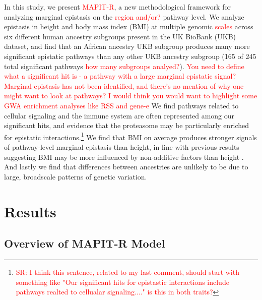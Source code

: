 \documentclass[12pt,a4paper]{article}
\newcommand{\red}[1]{\textcolor{red}{#1}}
\begin{document}
In this study, we present \red{MAPIT-R}, a new methodological framework for analyzing marginal epistasis on the \red{region and/or?} pathway level. We analyze epistasis in height and body mass index (BMI) at multiple genomic \red{scales} across six different human ancestry subgroups present in the UK BioBank (UKB) \citep{Sudlow2015} dataset, and find that an African ancestry UKB subgroup produces many more significant epistatic pathways than any other UKB ancestry subgroup (165 of 245 total significant pathways \red{how many subgroups analyed?}). \red{You need to define what a significant hit is - a pathway with a large marginal epistatic signal? Marginal epistasis has not been identified, and there's no mention of why one might want to look at pathways? I would think you would want to highlight some GWA enrichment analyses like RSS and gene-e} We find pathways related to cellular signaling and the immune system are often represented among our significant hits, and evidence that the proteasome may be particularly enriched for epistatic interactions.\footnote{\red{SR: I think this sentence, related to my last comment, should start with something like "Our significant hits for epistastic interactions include pathways realted to cellualar signaling...." is this in both traits?}} We find that BMI on average produces stronger signals of pathway-level marginal epistasis than height, in line with previous results suggesting BMI may be more influenced by non-additive factors than height \citep{Elks2012,Visscher2012}. And lastly we find that differences between ancestries are unlikely to be due to large, broadscale patterns of genetic variation.  








\section{Results}\label{InterPath-Results}

\subsection{Overview of MAPIT-R Model}\label{InterPath-Results-MAPITRModel}
\end{document}
